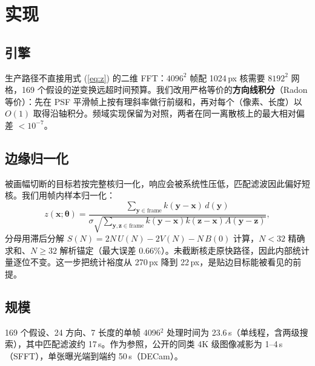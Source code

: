 \documentclass[11pt,a4paper]{ctexart}
\begin{document}
\section{实现}
\subsection{引擎}
生产路径不直接用式 (\ref{eq:z}) 的二维 FFT：$4096^2$ 帧配 1024\,px 核需要 $8192^2$ 网格，169 个假设的逆变换远超时间预算。我们改用严格等价的\textbf{方向线积分}（Radon 等价）：先在 PSF 平滑帧上按有理斜率做行前缀和，再对每个（像素、长度）以 $O(1)$ 取得沿轴积分。频域实现保留为对照，两者在同一离散核上的最大相对偏差 $<10^{-7}$。

\subsection{边缘归一化}
被画幅切断的目标若按完整核归一化，响应会被系统性压低，匹配滤波因此偏好短核。我们用帧内样本归一化：
\begin{equation}
z(\mathbf x;\boldsymbol\theta)=\frac{\sum_{\mathbf y\in\text{frame}} k(\mathbf y-\mathbf x)\,d(\mathbf y)}{\sigma\sqrt{\sum_{\mathbf y,\mathbf z\in\text{frame}}k(\mathbf y-\mathbf x)k(\mathbf z-\mathbf x)A(\mathbf y-\mathbf z)}},
\end{equation}
分母用滞后分解 $S(N)=2N\,U(N)-2V(N)-N\,B(0)$ 计算，$N<32$ 精确求和、$N\ge32$ 解析锚定（最大误差 0.66\%）。未截断核走原快路径，因此内部统计量逐位不变。这一步把统计裕度从 270\,px 降到 22\,px，是贴边目标能被看见的前提。

\subsection{规模}
169 个假设、24 方向、7 长度的单帧 4096$^2$ 处理时间为 23.6\,s（单线程，含两级搜索），其中匹配滤波约 17\,s。作为参照，公开的同类 4K 级图像减影为 1--4\,s（SFFT）\cite{hu2022}，单张曝光端到端约 50\,s（DECam）\cite{hu2026}。
\end{document}
